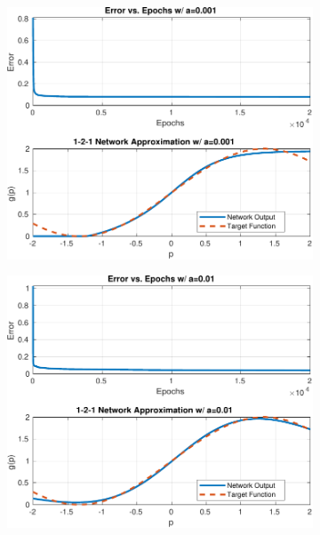 \begin{figure}[htpb]
	\centering
	\begin{subfigure}{0.47\textwidth}
		\centering
		\includegraphics[width=\textwidth]{../Problem 4/nn_images/1-2-1_NN_a=0.001.pdf}
		\caption{}
	\end{subfigure}
	\hfill
	\begin{subfigure}{0.47\textwidth}
		\centering
		\includegraphics[width=\textwidth]{../Problem 4/nn_images/1-2-1_NN_a=0.01.pdf}
		\caption{}
	\end{subfigure}\\

\end{figure}
